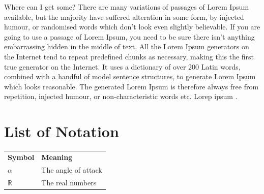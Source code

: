 \documentclass{ctuthesis}
\begin{document}
Where can I get some?
There are many variations of passages of Lorem Ipsum available, but the majority have suffered alteration in some form, by injected humour, or randomised words which don't look even slightly believable. If you are going to use a passage of Lorem Ipsum, you need to be sure there isn't anything embarrassing hidden in the middle of text. All the Lorem Ipsum generators on the Internet tend to repeat predefined chunks as necessary, making this the first true generator on the Internet. It uses a dictionary of over 200 Latin words, combined with a handful of model sentence structures, to generate Lorem Ipsum which looks reasonable. The generated Lorem Ipsum is therefore always free from repetition, injected humour, or non-characteristic words etc.
Lorep ipsum \cite{arslan2015machine} \cite{Ioan2012ompl} \cite{karaman2011rrtstar} \cite{lavalle1998rapidly}.
\cite{gottschalk1996rapid}




\appendix
\chapter*{List of Notation}
\noindent
\begin{tabularx}{\linewidth}
  { l >{\raggedright\arraybackslash}X }
\bfseries Symbol & \bfseries Meaning \\\Midrule
$\alpha$ & The angle of attack \\
$\mathbb{R}$ & The real numbers \\
\end{tabularx}
 
\end{document}
